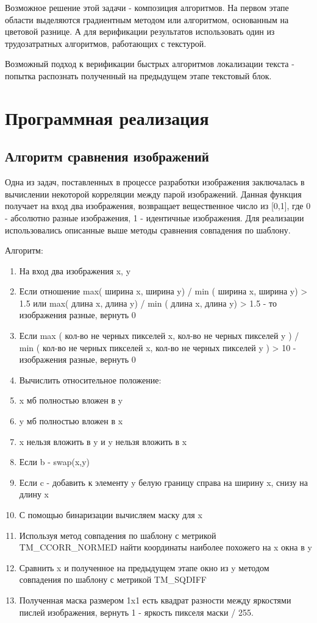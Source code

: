 \documentclass[oneside,final,14pt]{extreport}
\begin{document}
Возможное решение этой задачи - композиция алгоритмов. На первом этапе области выделяются градиентным методом или алгоритмом, основанным на цветовой разнице. А для верификации результатов использовать один из трудозатратных алгоритмов, работающих с текстурой.   

Возможный подход к верификации быстрых алгоритмов локализации текста - попытка распознать полученный на предыдущем этапе текстовый блок.

\chapter{Программная реализация}
\section{Алгоритм сравнения изображений}
Одна из задач, поставленных в процессе разработки изображения заключалась в вычислении некоторой корреляции между парой изображений. Данная функция получает на вход два изображения, возвращает вещественное число из [0,1], где 0 - абсолютно разные изображения, 1 - идентичные изображения.  Для реализации использовались описанные выше методы сравнения совпадения по шаблону.

Алгоритм:

\begin{enumerate}
\item На вход два изображения x, y
\item Если отношение max( ширина x, ширина y) / min ( ширина x, ширина y) > 1.5 или max( длина x, длина y) / min ( длина x, длина y) > 1.5 - то изображения разные, вернуть 0
\item Если  max ( кол-во не черных пикселей x,  кол-во не черных пикселей y ) / min ( кол-во не черных пикселей x,  кол-во не черных пикселей y ) > 10 - изображения разные, вернуть 0
\item Вычислить относительное положение: 
\item x мб полностью  вложен в y
\item y мб полностью вложен в x
\item x нельзя вложить в y и y нельзя вложить в  x
\item Если b - swap(x,y)
\item Если c - добавить к элементу y белую границу справа на ширину x, снизу на длину x
\item С помощью бинаризации вычисляем маску для x
\item Используя метод совпадения по шаблону с метрикой TM\_CCORR\_NORMED найти координаты наиболее похожего на x окна в y
\item Сравнить x и полученное на предыдущем этапе окно из y методом совпадения по шаблону с метрикой TM\_SQDIFF
\item Полученная маска размером 1x1 есть квадрат разности между яркостями пислей изображения, вернуть 1 - яркость пикселя маски / 255.
\end{enumerate}
\end{document}
